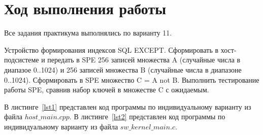 \section{Ход выполнения работы}

Все задания практикума выполнялись по варианту 11.

Устройство формирования индексов SQL EXCEPT. Сформировать в хост-подсистеме и передать в SPE 256 записей множества A (случайные числа в диапазое 0..1024) и 256 записей множества B (случайные числа в диапазоне 0..1024). Сформировать в SPE множество C = A not B. Выполнить тестирование работы SPE, сравнив набор ключей в множестве C с ожидаемым.


В листинге~\ref{lst1} представлен код программы по индивидуальному варианту из файла $host\_main.cpp$. В листинге~\ref{lst2} представлен код программы по индивидуальному варианту из файла $sw\_kernel\_main.c$.

